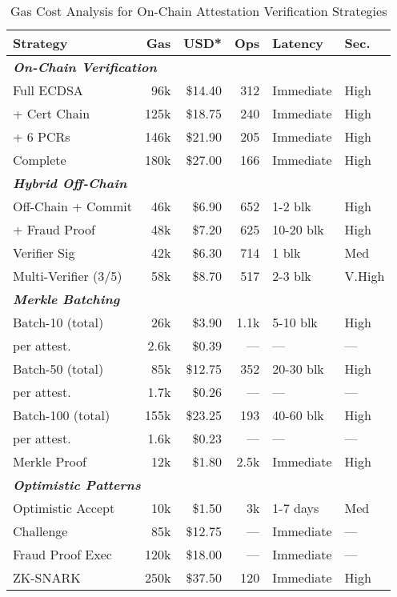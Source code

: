 \begin{table}[htbp]
\centering
\caption{Gas Cost Analysis for On-Chain Attestation Verification Strategies}
\label{tab:gas-optimization}
\footnotesize
\begin{tabular}{@{}lrrrll@{}}
\toprule
\textbf{Strategy} & \textbf{Gas} & \textbf{USD*} & \textbf{Ops} & \textbf{Latency} & \textbf{Sec.} \\
\midrule
\multicolumn{6}{l}{\textit{\textbf{On-Chain Verification}}} \\
Full ECDSA & 96k & \$14.40 & 312 & Immediate & High \\
+ Cert Chain & 125k & \$18.75 & 240 & Immediate & High \\
+ 6 PCRs & 146k & \$21.90 & 205 & Immediate & High \\
Complete & 180k & \$27.00 & 166 & Immediate & High \\
\midrule
\multicolumn{6}{l}{\textit{\textbf{Hybrid Off-Chain}}} \\
Off-Chain + Commit & 46k & \$6.90 & 652 & 1-2 blk & High \\
+ Fraud Proof & 48k & \$7.20 & 625 & 10-20 blk & High \\
Verifier Sig & 42k & \$6.30 & 714 & 1 blk & Med \\
Multi-Verifier (3/5) & 58k & \$8.70 & 517 & 2-3 blk & V.High \\
\midrule
\multicolumn{6}{l}{\textit{\textbf{Merkle Batching}}} \\
Batch-10 (total) & 26k & \$3.90 & 1.1k & 5-10 blk & High \\
\quad per attest. & 2.6k & \$0.39 & --- & --- & --- \\
Batch-50 (total) & 85k & \$12.75 & 352 & 20-30 blk & High \\
\quad per attest. & 1.7k & \$0.26 & --- & --- & --- \\
Batch-100 (total) & 155k & \$23.25 & 193 & 40-60 blk & High \\
\quad per attest. & 1.6k & \$0.23 & --- & --- & --- \\
Merkle Proof & 12k & \$1.80 & 2.5k & Immediate & High \\
\midrule
\multicolumn{6}{l}{\textit{\textbf{Optimistic Patterns}}} \\
Optimistic Accept & 10k & \$1.50 & 3k & 1-7 days & Med \\
Challenge & 85k & \$12.75 & --- & Immediate & --- \\
Fraud Proof Exec & 120k & \$18.00 & --- & Immediate & --- \\
ZK-SNARK & 250k & \$37.50 & 120 & Immediate & High \\

\end{tabular}
\end{table}
